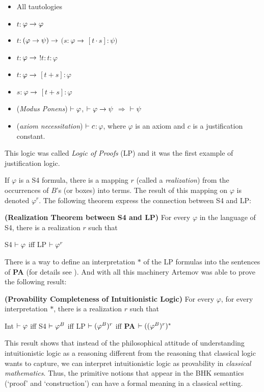 \begin{itemize}
	\item[] All tautologies
	\item[] $t$$:$$\varphi \rightarrow \varphi$
	\item[] $t$$:$$(\varphi \rightarrow \psi) \rightarrow$ $(s$$:$$\varphi \rightarrow$ $[t\cdot s]$$:$$\psi)$
	\item[] $t$$:$$\varphi \rightarrow$ $!t$$:$$t$$:$$\varphi$
	\item[] $t$$:$$\varphi \rightarrow$ $[t+s]$$:$$\varphi$ 
	\item[] $s$$:$$\varphi \rightarrow$ $[t+s]$$:$$\varphi$
	\item[] (\textit{Modus Ponens}) $\vdash \varphi$, $\vdash \varphi\rightarrow\psi$ $\Rightarrow$ $\vdash \psi$
	\item[] (\textit{axiom necessitation})  $\vdash c$$:$$\varphi$, where $\varphi$ is an axiom and $c$ is a justification constant.
\end{itemize}

\qquad This logic was called \textit{Logic of Proofs} (LP) and it was the first example of justification logic.


\qquad If $\varphi$ is a S4 formula, there is a mapping $r$ (called a \textit{realization}) from the occurrences of $B$'s (or boxes) into terms. The result of this mapping on $\varphi$ is denoted $\varphi^{r}$. The following theorem express the connection between S4 and LP:

\textbf{(Realization Theorem between S4 and LP)} For every $\varphi$ in the language of S4, there is a realization $r$ such that

\begin{center}
S4 $\vdash \varphi$ iff LP $\vdash \varphi^{r}$ 
\end{center}

\qquad There is a way to define an interpretation $*$ of the LP formulas into the sentences of \textbf{PA} (for details see \cite{Artemov01}). And with all this machinery Artemov was able to prove the following result:

\textbf{(Provability Completeness of Intuitionistic Logic)} For every $\varphi$, for every interpretation $*$, there is a realization $r$ such that

\begin{center}
Int $\vdash \varphi$ iff S4 $\vdash \varphi^{B}$ iff LP $\vdash (\varphi^{B})^{r}$ iff \textbf{PA} $\vdash ((\varphi^{B})^{r})^{*}$
\end{center}


\qquad This result shows that instead of the philosophical attitude of understanding intuitionistic logic as a reasoning different from the reasoning that classical logic wants to capture, we can interpret intuitionistic logic as provability in \textit{classical mathematics}. Thus, the primitive notions that appear in the BHK semantics (`proof' and `construction') can have a formal meaning in a classical setting.



